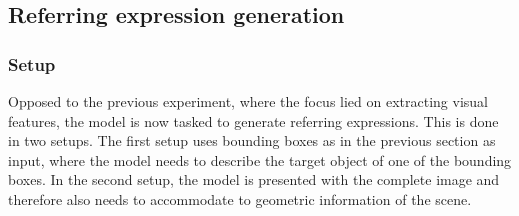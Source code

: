 \subsection{Referring expression generation}
\label{sec:referring_expression_generation}
\subsubsection*{Setup}

Opposed to the previous experiment, where the focus lied on extracting visual features, the model is now tasked to generate referring expressions.
This is done in two setups.
The first setup uses bounding boxes as in the previous section as input, where the model needs to describe the target object of one of the bounding boxes.
In the second setup, the model is presented with the complete image and therefore also needs to accommodate to geometric information of the scene.

